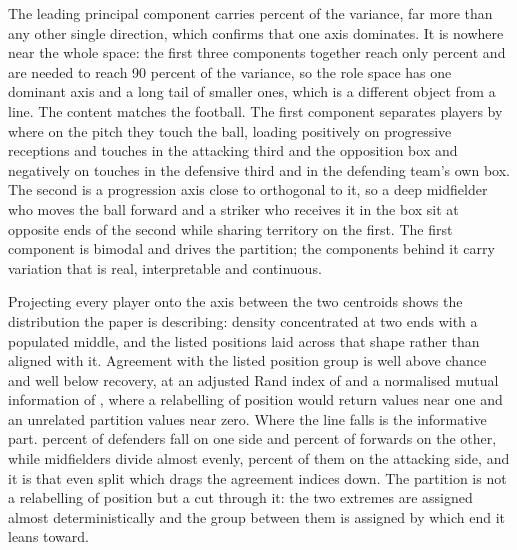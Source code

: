 The leading principal component carries \ArcPCOne{} percent of the variance, far more than any
other single direction, which confirms that one axis dominates. It is nowhere near the whole
space: the first three components together reach only \ArcPCThree{} percent and \ArcPCNinety{}
are needed to reach 90 percent of the variance, so the role space has one dominant axis and a long
tail of smaller ones, which is a different object from a line. The content matches the football.
The first component separates players by where on the pitch they touch the ball, loading
positively on progressive receptions and touches in the attacking third and the opposition box
and negatively on touches in the defensive third and in the defending team's own box. The second
is a progression axis close to orthogonal to it, so a deep midfielder who moves the ball forward
and a striker who receives it in the box sit at opposite ends of the second while sharing
territory on the first. The first component is bimodal and drives the partition; the components
behind it carry variation that is real, interpretable and continuous.

Projecting every player onto the axis between the two centroids shows the distribution the paper
is describing: density concentrated at two ends with a populated middle, and the listed positions
laid across that shape rather than aligned with it. Agreement with the listed position group is
well above chance and well below recovery, at an adjusted Rand index of \ArcARIvsPosition{} and a
normalised mutual information of \ArcNMIvsPosition{}, where a relabelling of position would return
values near one and an unrelated partition values near zero. Where the line falls is the
informative part. \ArcSplitDF{} percent of defenders fall on one side and \ArcSplitFW{} percent of
forwards on the other, while midfielders divide almost evenly, \ArcSplitMF{} percent of
them on the attacking side, and it is that even split which drags the agreement indices down. The
partition is not a relabelling of position but a cut through it: the two extremes are assigned
almost deterministically and the group between them is assigned by which end it leans toward.

